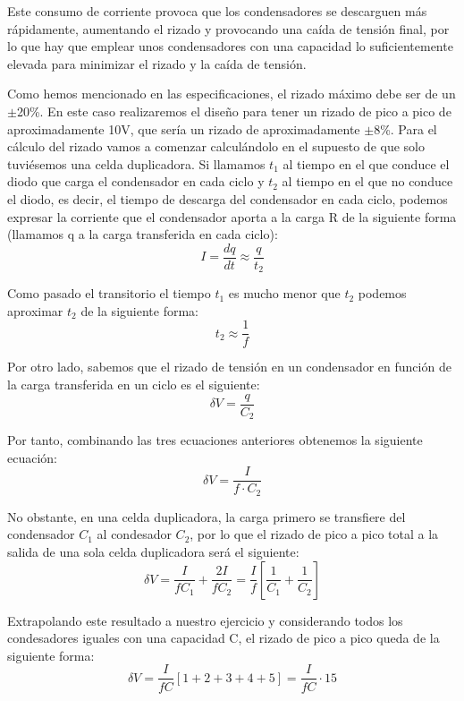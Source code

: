 Este consumo de corriente provoca que los condensadores se descarguen más rápidamente, aumentando 
el rizado y provocando una caída de tensión final, por lo que hay que emplear unos condensadores con 
una capacidad lo suficientemente elevada para minimizar el rizado y la caída de tensión.

Como hemos mencionado en las especificaciones, el rizado máximo debe ser de un $\pm$20\%. En este caso 
realizaremos el diseño para tener un rizado de pico a pico de aproximadamente 10V, que sería un 
rizado de aproximadamente $\pm$8\%. Para el cálculo del rizado vamos a comenzar calculándolo 
en el supuesto de que solo tuviésemos una celda duplicadora. Si llamamos $t_1$ al tiempo en el que conduce el diodo que carga 
el condensador en cada ciclo y $t_2$ al tiempo en el que no conduce el diodo, es decir, el tiempo de descarga 
del condensador en cada ciclo, podemos expresar la corriente que el condensador aporta a la carga R de la siguiente forma (llamamos 
q a la carga transferida en cada ciclo):
\begin{equation}
    I = \frac{dq}{dt} \approx \frac{q}{t_2}
\end{equation}

Como pasado el transitorio el tiempo $t_1$ es mucho menor que $t_2$ podemos aproximar 
$t_2$ de la siguiente forma:
\begin{equation}
    t_2 \approx \frac{1}{f}
\end{equation}

Por otro lado, sabemos que el rizado de tensión en un condensador en función de la carga transferida 
en un ciclo es el siguiente:
\begin{equation}
    \delta V = \frac{q}{C_2}
\end{equation}

Por tanto, combinando las tres ecuaciones anteriores obtenemos la siguiente ecuación:
\begin{equation}
    \delta V = \frac{I}{f\cdot C_2}
\end{equation}

No obstante, en una celda duplicadora, la carga primero se transfiere del condensador $C_1$ al condesador 
$C_2$, por lo que el rizado de pico a pico total a la salida de una sola celda duplicadora será el siguiente:
\begin{equation}
    \delta V = \frac{I}{fC_1}+\frac{2I}{fC_2} = \frac{I}{f}\left[\frac{1}{C_1}+\frac{1}{C_2}\right]
\end{equation}

Extrapolando este resultado a nuestro ejercicio y considerando todos los condesadores iguales con 
una capacidad C, el rizado de pico a pico queda de la siguiente forma:
\begin{equation}
    \delta V = \frac{I}{fC}[1+2+3+4+5]=\frac{I}{fC}\cdot15
\end{equation}

